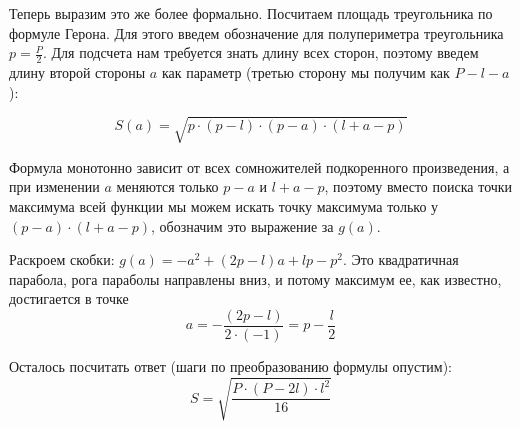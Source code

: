\begin{itemize}
\begin{center}\end{center}


Теперь выразим это же более формально. 
Посчитаем площадь треугольника по формуле Герона. 
Для этого введем обозначение для полупериметра треугольника $p = \frac{P}{2}$.
Для подсчета нам требуется знать длину всех 
сторон, поэтому введем длину второй стороны $a$ как параметр 
(третью сторону мы получим как $P-l-a$):

$$S(a) = \sqrt{p\cdot(p-l)\cdot(p-a)\cdot(l+a-p)}$$

Формула монотонно зависит от всех сомножителей подкоренного произведения, 
а при изменении $a$ меняются только $p-a$ и $l+a-p$, поэтому вместо поиска точки
максимума всей функции мы можем искать точку максимума только у $(p-a)\cdot(l+a-p)$,
обозначим это выражение за $g(a)$.

Раскроем скобки: $g(a) = -a^2 + (2p - l)a + lp - p^2$. Это квадратичная парабола, 
рога параболы направлены вниз, и потому максимум ее, как известно, достигается в 
точке $$a = -\frac{(2p-l)}{2\cdot(-1)} = p-\frac{l}{2}$$

Осталось посчитать ответ (шаги по преобразованию формулы опустим): 
$$S = \sqrt{\frac{P\cdot(P-2l)\cdot l^2}{16}}$$

\end{itemize}

